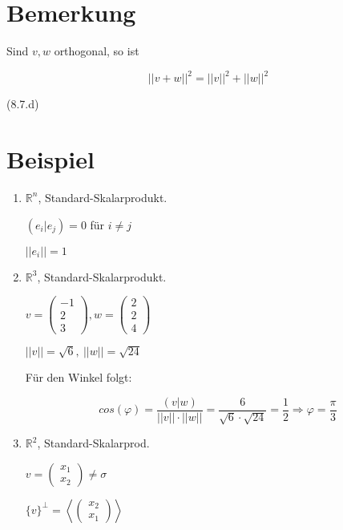 \documentclass[a4paper, openany]{book}
\begin{document}
        \section{Bemerkung}

        Sind $v,w$ orthogonal, so ist 

        \begin{equation}
          ||v + w||^2 = ||v||^2 + ||w||^2
        \end{equation}

        (8.7.d) 

        \section{Beispiel}

        \begin{enumerate}[label=(\alph*)]
          \item $\mathbb{R}^n$, Standard-Skalarprodukt.

          $(e_i | e_j) = 0$ für $i \neq j$

          $||e_i|| = 1$

          \item $\mathbb{R}^3$, Standard-Skalarprodukt.

          $v = \begin{pmatrix}-1 \\ 2 \\ 3 \end{pmatrix}, w = \begin{pmatrix}2 \\ 2 \\ 4 \end{pmatrix}$

          \par \medskip

          $||v|| = \sqrt{6}, \ ||w|| = \sqrt{24}$

          Für den Winkel folgt:

          \[ cos(\varphi) = \frac{(v|w)}{||v|| \cdot ||w||} = \frac{6}{\sqrt{6} \cdot \sqrt{24}} = \frac{1}{2} \Rightarrow \varphi = \frac{\pi}{3} \]

          \item $\mathbb{R}^2$, Standard-Skalarprod.

          $v = \begin{pmatrix}x_1 \\ x_2 \end{pmatrix} \neq \sigma$

          $\{v\}^{\perp} = \left \langle \begin{pmatrix}x_2 \\ x_1 \end{pmatrix} \right \rangle$
        \end{enumerate} 
\end{document}
